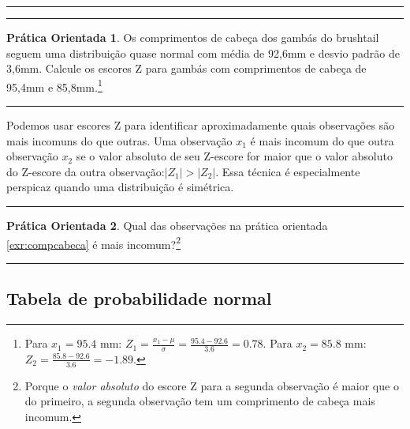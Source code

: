 \documentclass[
]{book}
\theoremstyle{definition}
\theoremstyle{definition}
\theoremstyle{definition}
\newtheorem{exercise}{Prática Orientada}[chapter]
\theoremstyle{definition}
\theoremstyle{remark}
\begin{document}
\begin{center}\rule{0.5\linewidth}{0.5pt}\end{center}

\begin{center}\rule{0.5\linewidth}{0.5pt}\end{center}

\begin{exercise}
\protect\hypertarget{exr:compcabeca}{}{\label{exr:compcabeca} }Os comprimentos de cabeça dos gambás do brushtail seguem uma distribuição quase normal com média de 92,6mm e desvio padrão de 3,6mm. Calcule os escores Z para gambás com comprimentos de cabeça de 95,4mm e 85,8mm.\footnote{Para \(x_1=95.4\) mm: \(Z_1 = \frac{x_1 - \mu}{\sigma} = \frac{95.4 - 92.6}{3.6} = 0.78\). Para \(x_2=85.8\) mm: \(Z_2 = \frac{85.8 - 92.6}{3.6} = -1.89\).}
\end{exercise}

\begin{center}\rule{0.5\linewidth}{0.5pt}\end{center}

Podemos usar escores Z para identificar aproximadamente quais observações são mais incomuns do que outras. Uma observação \(x_1\) é mais incomum do que outra observação \(x_2\) se o valor absoluto de seu Z-escore for maior que o valor absoluto do Z-escore da outra observação:\(|Z_1| > |Z_2|\). Essa técnica é especialmente perspicaz quando uma distribuição é simétrica.

\begin{center}\rule{0.5\linewidth}{0.5pt}\end{center}

\begin{exercise}
\protect\hypertarget{exr:unnamed-chunk-87}{}{\label{exr:unnamed-chunk-87} }Qual das observações na prática orientada \ref{exr:compcabeca} é mais incomum?\footnote{Porque o \emph{valor absoluto} do escore Z para a segunda observação é maior que o do primeiro, a segunda observação tem um comprimento de cabeça mais incomum.}
\end{exercise}

\begin{center}\rule{0.5\linewidth}{0.5pt}\end{center}

\hypertarget{normalProbabilityTabel}{%
\subsection{Tabela de probabilidade normal}\label{normalProbabilityTabel}}
\end{document}
